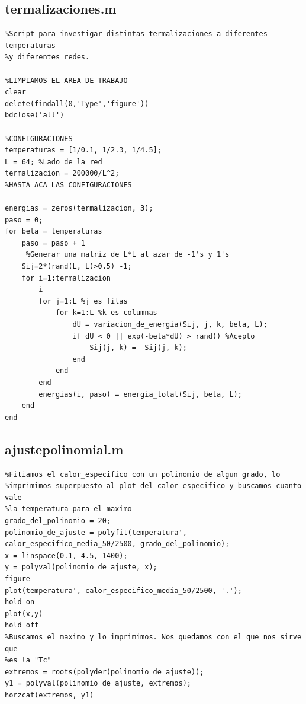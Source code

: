 \documentclass[twocolumn,Spanish,a4paper,11pt]{article}
\begin{document}
\subsection{termalizaciones.m}
\begin{lstlisting}
%Script para investigar distintas termalizaciones a diferentes temperaturas
%y diferentes redes.

%LIMPIAMOS EL AREA DE TRABAJO
clear
delete(findall(0,'Type','figure'))
bdclose('all')

%CONFIGURACIONES
temperaturas = [1/0.1, 1/2.3, 1/4.5]; 
L = 64; %Lado de la red
termalizacion = 200000/L^2;
%HASTA ACA LAS CONFIGURACIONES

energias = zeros(termalizacion, 3);
paso = 0;
for beta = temperaturas
    paso = paso + 1
     %Generar una matriz de L*L al azar de -1's y 1's
    Sij=2*(rand(L, L)>0.5) -1;
    for i=1:termalizacion
        i
        for j=1:L %j es filas
            for k=1:L %k es columnas
                dU = variacion_de_energia(Sij, j, k, beta, L);
                if dU < 0 || exp(-beta*dU) > rand() %Acepto
                    Sij(j, k) = -Sij(j, k);
                end
            end
        end
        energias(i, paso) = energia_total(Sij, beta, L);
    end
end
\end{lstlisting}
\subsection{ajustepolinomial.m}
\begin{lstlisting}
%Fitiamos el calor_especifico con un polinomio de algun grado, lo
%imprimimos superpuesto al plot del calor especifico y buscamos cuanto vale
%la temperatura para el maximo
grado_del_polinomio = 20;
polinomio_de_ajuste = polyfit(temperatura', calor_especifico_media_50/2500, grado_del_polinomio);
x = linspace(0.1, 4.5, 1400);
y = polyval(polinomio_de_ajuste, x);
figure
plot(temperatura', calor_especifico_media_50/2500, '.');
hold on
plot(x,y)
hold off
%Buscamos el maximo y lo imprimimos. Nos quedamos con el que nos sirve que
%es la "Tc"
extremos = roots(polyder(polinomio_de_ajuste));
y1 = polyval(polinomio_de_ajuste, extremos);
horzcat(extremos, y1)

\end{lstlisting}
\end{document}
